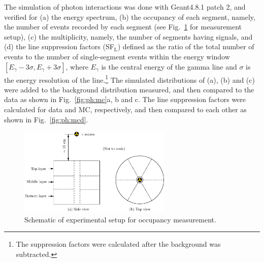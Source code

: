 The simulation of photon interactions was done with Geant4.8.1 patch
2, and verified for (a) the energy spectrum, (b) the occupancy of each
segment, namely, the number of events recorded by each segment (see
Fig.~\ref{fig:ph:occ} for measurement setup), (c) the multiplicity,
namely, the number of segments having signals, and (d) the line
suppression factors (SF$_{\text{L}}$) defined as the ratio of the
total number of events to the number of single-segment events within
the energy window $[E_{\gamma} - 3\sigma, E_{\gamma} + 3\sigma]$,
where $E_{\gamma}$ is the central energy of the gamma line and
$\sigma$ is the energy resolution of the line.\footnote{The
suppression factors were calculated after the background was
subtracted.} The simulated distributions of (a), (b) and (c) were
added to the background distribution measured, and then compared to
the data as shown in Fig.~\ref{fig:ph:mc}a, b and c. The line
suppression factors were calculated for data and MC, respectively, and
then compared to each other as shown in Fig.~\ref{fig:ph:mcd}.

\begin{figure}[htpb]
\centering
\includegraphics[width=0.65\textwidth]{occumea}
\caption{Schematic of experimental setup for occupancy measurement.}
\label{fig:ph:occ}
\end{figure}

